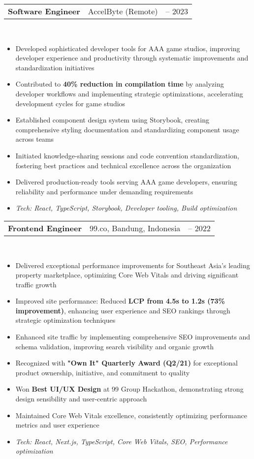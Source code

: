 \documentclass[a4paper, 11pt]{article}
\newcommand{\resumeItem}[1]{
  \item\small{
    {#1 \vspace{-2pt}}
  }
}
\newcommand{\resumeSubheading}[4]{
  \vspace{-2pt}\item
    \begin{tabularx}{0.987\textwidth}[t]{
  >{\raggedright\arraybackslash}X
  >{\centering\arraybackslash}X
  >{\raggedleft\arraybackslash}X }
      \textbf{#1} & #2 & #3 \\
    \end{tabularx}
    \textit{\small#4}\\
    \vspace{-7pt}
}
\newcommand{\resumeItemListStart}{\begin{itemize}[leftmargin=0.22in]}
\newcommand{\resumeItemListEnd}{\end{itemize}\vspace{-20pt}}
\begin{document}
        \resumeSubheading
            {Software Engineer}{AccelByte (Remote)}{2022 -- 2023}{}
            \resumeItemListStart
                \resumeItem{Developed sophisticated developer tools for AAA game studios, improving developer experience and productivity through systematic improvements and standardization initiatives}
                \resumeItem{Contributed to \textbf{40\% reduction in compilation time} by analyzing developer workflows and implementing strategic optimizations, accelerating development cycles for game studios}
                \resumeItem{Established component design system using Storybook, creating comprehensive styling documentation and standardizing component usage across teams}
                \resumeItem{Initiated knowledge-sharing sessions and code convention standardization, fostering best practices and technical excellence across the organization}
                \resumeItem{Delivered production-ready tools serving AAA game developers, ensuring reliability and performance under demanding requirements}
                \resumeItem{\textit{Tech: React, TypeScript, Storybook, Developer tooling, Build optimization}}
            \resumeItemListEnd

        \resumeSubheading
            {Frontend Engineer}{99.co, Bandung, Indonesia}{2020 -- 2022}{}
            \resumeItemListStart
                \resumeItem{Delivered exceptional performance improvements for Southeast Asia's leading property marketplace, optimizing Core Web Vitals and driving significant traffic growth}
                \resumeItem{Improved site performance: Reduced \textbf{LCP from 4.5s to 1.2s (73\% improvement)}, enhancing user experience and SEO rankings through strategic optimization techniques}
                \resumeItem{Enhanced site traffic by implementing comprehensive SEO improvements and schema validation, improving search visibility and organic growth}
                \resumeItem{Recognized with \textbf{"Own It" Quarterly Award (Q2/21)} for exceptional product ownership, initiative, and commitment to quality}
                \resumeItem{Won \textbf{Best UI/UX Design} at 99 Group Hackathon, demonstrating strong design sensibility and user-centric approach}
                \resumeItem{Maintained Core Web Vitals excellence, consistently optimizing performance metrics and user experience}
                \resumeItem{\textit{Tech: React, Next.js, TypeScript, Core Web Vitals, SEO, Performance optimization}}
            \resumeItemListEnd
\end{document}
